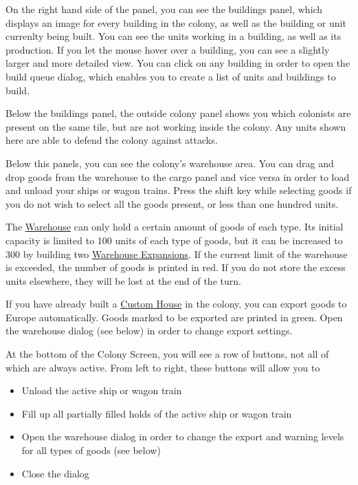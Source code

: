 \documentclass[12pt]{book}
\begin{document}
On the right hand side of the panel, you can see the buildings panel,
which displays an image for every building in the colony, as well as
the building or unit currenlty being built. You can see the units
working in a building, as well as its production. If you let the mouse
hover over a building, you can see a slightly larger and more detailed
view. You can click on any building in order to open the build queue
dialog, which enables you to create a list of units and buildings to
build.

Below the buildings panel, the outside colony panel shows you which
colonists are present on the same tile, but are not working inside the
colony. Any units shown here are able to defend the colony against
attacks. 

Below this panels, you can see the colony's warehouse area. You can
drag and drop goods from the warehouse to the cargo panel and vice
versa in order to load and unload your ships or wagon trains. Press
the shift key while selecting goods if you do not wish to select all
the goods present, or less than one hundred units.

The \hyperlink{Warehouse}{Warehouse} can only hold a certain amount of
goods of each type. Its initial capacity is limited to 100 units of
each type of goods, but it can be increased to 300 by building two
\hyperlink{Warehouse Expansion}{Warehouse Expansions}. If the current
limit of the warehouse is exceeded, the number of goods is printed in
red. If you do not store the excess units elsewhere, they will be lost
at the end of the turn.

If you have already built a \hyperlink{Custom House}{Custom House} in
the colony, you can export goods to Europe automatically. Goods marked
to be exported are printed in green. Open the warehouse dialog (see
below) in order to change export settings.

At the bottom of the Colony Screen, you will see a row of buttons, not
all of which are always active. From left to right, these buttons will
allow you to

\begin{itemize}
\item Unload the active ship or wagon train
\item Fill up all partially filled holds of the active ship or
wagon train
\item Open the warehouse dialog in order to change the export and
warning levels for all types of goods (see below)
\item Close the dialog
\end{itemize}
\end{document}
